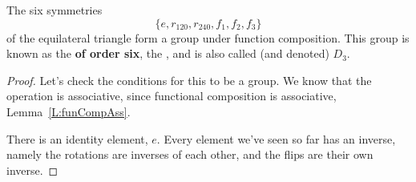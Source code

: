 \documentclass{ximera}
\begin{document}
\begin{example}
  The six symmetries
  \[
  \{e,r_{120},r_{240},f_1,f_2,f_3\}
  \]
  of the equilateral triangle form a group under function
  composition. This group is known as the \textbf{
    of order six}, the ,
  and is also called (and denoted) $D_3$.
  \begin{proof}
    Let's check the conditions for this to be a group. We know that
    the operation is associative, since functional composition is
    associative, Lemma~\ref{L:funCompAss}.

    There is an identity element, $e$. Every element we've seen so far
    has an inverse, namely the rotations are inverses of each other,
    and the flips are their own inverse.
    

\end{proof}
\end{example}
\end{document}
